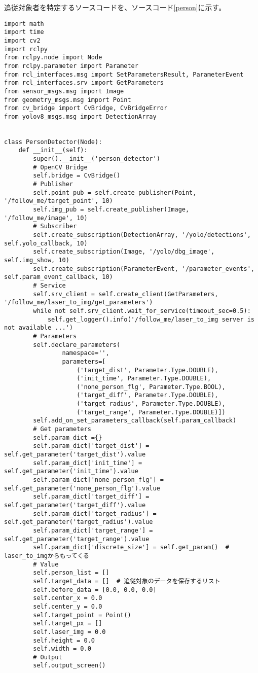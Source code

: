 追従対象者を特定するソースコードを、ソースコード\ref{person}に示す。
\begin{lstlisting}[caption=person\_detector.py, label=person]
import math
import time
import cv2
import rclpy
from rclpy.node import Node
from rclpy.parameter import Parameter
from rcl_interfaces.msg import SetParametersResult, ParameterEvent
from rcl_interfaces.srv import GetParameters
from sensor_msgs.msg import Image
from geometry_msgs.msg import Point
from cv_bridge import CvBridge, CvBridgeError
from yolov8_msgs.msg import DetectionArray


class PersonDetector(Node):
    def __init__(self):
        super().__init__('person_detector')
        # OpenCV Bridge
        self.bridge = CvBridge()
        # Publisher
        self.point_pub = self.create_publisher(Point, '/follow_me/target_point', 10)
        self.img_pub = self.create_publisher(Image, '/follow_me/image', 10)
        # Subscriber
        self.create_subscription(DetectionArray, '/yolo/detections', self.yolo_callback, 10)
        self.create_subscription(Image, '/yolo/dbg_image', self.img_show, 10)
        self.create_subscription(ParameterEvent, '/parameter_events', self.param_event_callback, 10)
        # Service
        self.srv_client = self.create_client(GetParameters, '/follow_me/laser_to_img/get_parameters')
        while not self.srv_client.wait_for_service(timeout_sec=0.5):
            self.get_logger().info('/follow_me/laser_to_img server is not available ...')
        # Parameters
        self.declare_parameters(
                namespace='',
                parameters=[
                    ('target_dist', Parameter.Type.DOUBLE),
                    ('init_time', Parameter.Type.DOUBLE),
                    ('none_person_flg', Parameter.Type.BOOL),
                    ('target_diff', Parameter.Type.DOUBLE),
                    ('target_radius', Parameter.Type.DOUBLE),
                    ('target_range', Parameter.Type.DOUBLE)])
        self.add_on_set_parameters_callback(self.param_callback)
        # Get parameters
        self.param_dict ={}
        self.param_dict['target_dist'] = self.get_parameter('target_dist').value
        self.param_dict['init_time'] = self.get_parameter('init_time').value
        self.param_dict['none_person_flg'] = self.get_parameter('none_person_flg').value
        self.param_dict['target_diff'] = self.get_parameter('target_diff').value
        self.param_dict['target_radius'] = self.get_parameter('target_radius').value
        self.param_dict['target_range'] = self.get_parameter('target_range').value
        self.param_dict['discrete_size'] = self.get_param()  # laser_to_imgからもってくる
        # Value
        self.person_list = []
        self.target_data = []  # 追従対象のデータを保存するリスト
        self.before_data = [0.0, 0.0, 0.0]
        self.center_x = 0.0
        self.center_y = 0.0
        self.target_point = Point()
        self.target_px = []
        self.laser_img = 0.0
        self.height = 0.0
        self.width = 0.0
        # Output
        self.output_screen()


\end{lstlisting}
